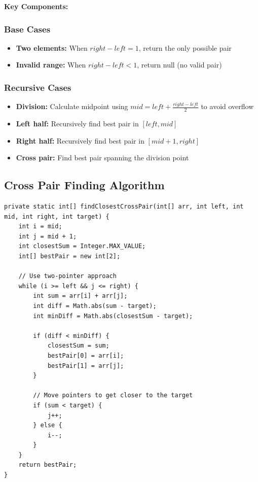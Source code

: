 \documentclass[12pt,a4paper]{article}
\begin{document}
\textbf{Key Components:}

\subsubsection{Base Cases}
\begin{itemize}
    \item \textbf{Two elements:} When $right - left = 1$, return the only possible pair
    \item \textbf{Invalid range:} When $right - left < 1$, return null (no valid pair)
\end{itemize}

\subsubsection{Recursive Cases}
\begin{itemize}
    \item \textbf{Division:} Calculate midpoint using $mid = left + \frac{right - left}{2}$ to avoid overflow
    \item \textbf{Left half:} Recursively find best pair in $[left, mid]$
    \item \textbf{Right half:} Recursively find best pair in $[mid+1, right]$
    \item \textbf{Cross pair:} Find best pair spanning the division point
\end{itemize}

\subsection{Cross Pair Finding Algorithm}

\begin{lstlisting}[caption=Cross Pair Finding with Two Pointers]
private static int[] findClosestCrossPair(int[] arr, int left, int mid, int right, int target) {
    int i = mid;
    int j = mid + 1;
    int closestSum = Integer.MAX_VALUE;
    int[] bestPair = new int[2];

    // Use two-pointer approach
    while (i >= left && j <= right) {
        int sum = arr[i] + arr[j];
        int diff = Math.abs(sum - target);
        int minDiff = Math.abs(closestSum - target);

        if (diff < minDiff) {
            closestSum = sum;
            bestPair[0] = arr[i];
            bestPair[1] = arr[j];
        }
        
        // Move pointers to get closer to the target
        if (sum < target) {
            j++;
        } else {
            i--;
        }
    }
    return bestPair;
}
\end{lstlisting}
\end{document}
